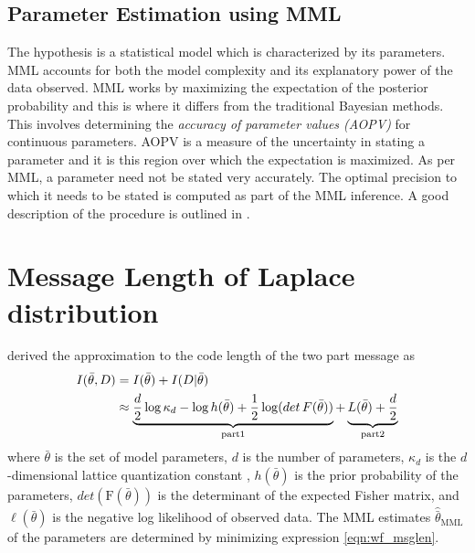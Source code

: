 \documentclass[wcp]{jmlr}
\begin{document}
\subsection{Parameter Estimation using MML}
The hypothesis is a statistical model which is characterized by its parameters.
MML accounts for both the model complexity and its explanatory power of the 
data observed. MML works by maximizing the expectation of the posterior
probability and this is where it differs from the traditional Bayesian methods.
This involves determining the \emph{accuracy of parameter values (AOPV)} for
continuous parameters. AOPV is a measure of the uncertainty in stating a
parameter and it is this region over which the expectation is maximized. As per
MML, a parameter need not be stated very accurately. The optimal precision to which
it needs to be stated is computed as part of the MML inference. A good
description of the procedure is outlined in \citet{oliver1994mml}. 

\section{Message Length of Laplace distribution}
\citet{wallace-87} derived the approximation to the code length of the two part message as
\begin{align}
I(\bar{\theta},D) &= I(\bar{\theta}) + I(D|\bar{\theta}) \notag\\
&\approx \underbrace{\frac{d}{2}\log\kappa_d -\log h(\bar{\theta}) + \frac{1}{2}\log(det\,F(\bar{\theta}))}_{\mathrm{part 1}} + \underbrace{L(\bar{\theta}) + \frac{d}{2}}_{\mathrm{part 2}} \label{eqn:wf_msglen}
\end{align}
where $\bar{\theta}$ is the set of model parameters, $d$ is the number of parameters, 
$\kappa_d$ is the $d$-dimensional lattice quantization constant \citep{conwaySloane84}, 
$h(\bar{\theta})$ is the prior probability of the parameters, 
$det(\mathrm{F}(\bar{\theta}))$ is the determinant of the expected Fisher matrix, and
$\ell(\bar{\theta})$ is the negative log likelihood of observed data. The MML estimates 
$\hat{\bar{\theta}}_{\mathrm{MML}}$ of the parameters are determined by minimizing 
expression \eqref{eqn:wf_msglen}. 
\end{document}
